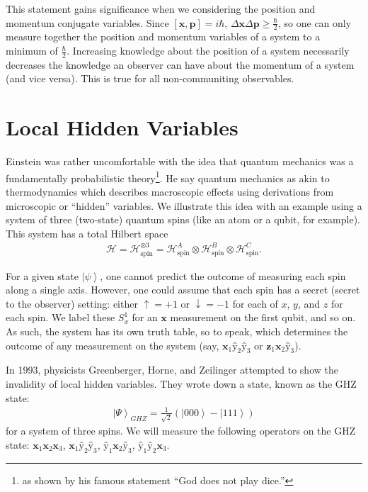 \documentclass[11pt]{article} %
\newcommand{\ket}[1]{\left|#1\right\rangle}
\begin{document}
This statement gains significance when we considering the position and momentum conjugate variables. Since $\left[\textbf{\^x},\textbf{\^p}\right] = i\hbar$, $\Delta\textbf{\^x}\Delta\textbf{\^p} \geq \frac{\hbar}{2}$, so one can only measure together the position and momentum variables of a system to a minimum of $\frac{\hbar}{2}$. Increasing knowledge about the position of a system necessarily decreases the knowledge an observer can have about the momentum of a system (and vice versa). This is true for all non-communiting observables.

\section{Local Hidden Variables}

Einstein was rather uncomfortable with the idea that quantum mechanics was a fundamentally probabilistic theory\footnote{as shown by his famous statement ``God does not play dice.''}. He say quantum mechanics as akin to thermodynamics which describes macroscopic effects using derivations from microscopic or ``hidden'' variables. We illustrate this idea with an example using a system of three (two-state) quantum spins (like an atom or a qubit, for example). This system has a total Hilbert space
\begin{align}
\mathcal{H} = \mathcal{H}^{\otimes3}_\textrm{spin} = \mathcal{H}^A_\textrm{spin}\otimes\mathcal{H}^B_\textrm{spin}\otimes\mathcal{H}^C_\textrm{spin}.
\end{align}

For a given state $\ket{\psi}$, one cannot predict the outcome of measuring each spin along a single axis. However, one could assume that each spin has a secret (secret to the observer) setting: either $\uparrow = +1$ or $\downarrow = -1$ for each of $x$, $y$, and $z$ for each spin. We label these $S^1_x$ for an $\textbf{\^x}$ measurement on the first qubit, and so on. As such, the system has its own truth table, so to speak, which determines the outcome of any measurement on the system (say, $\textbf{\^x}_1\textbf{\^y}_2\textbf{\^y}_3$ or $\textbf{\^z}_1\textbf{\^x}_2\textbf{\^y}_3$).

In 1993, physicists Greenberger, Horne, and Zeilinger attempted to show the invalidity of local hidden variables. They wrote down a state, known as the GHZ state:
\begin{align}
    \ket{\Psi}_{GHZ} = \frac{1}{\sqrt{2}}\left(\ket{000} - \ket{111}\right)
\end{align}
for a system of three spins. We will measure the following operators on the GHZ state: $\textbf{\^x}_1\textbf{\^x}_2\textbf{\^x}_3$, $\textbf{\^x}_1\textbf{\^y}_2\textbf{\^y}_3$, $\textbf{\^y}_1\textbf{\^x}_2\textbf{\^y}_3$, $\textbf{\^y}_1\textbf{\^y}_2\textbf{\^x}_3$.
\end{document}

